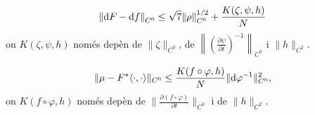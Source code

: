 
\begin{lema}
    \label{lema:lema6}
    \begin{equation*}
        \left\| \text dF -\text df \right\|_{C^0} \le \sqrt{7}\|\rho\|^{1/2}_{C^0} + \frac{K(\zeta,\psi,h)}{N}
    \end{equation*}
    on $K(\zeta,\psi,h)$ només depèn de $\|\zeta\|_{C^0}$, de $\left\|\left(  \frac{\partial\psi}{\partial t}\right)^{-1}\right\|_{C^0}$ i $\|h\|_{C^2}$.
\end{lema}

\begin{lema}
    \label{lema:lema7}
    \begin{equation*}
        \|\mu-F^*\langle\cdot, \cdot\rangle\|_{C^0} \le \frac{K(f\circ\varphi,h)}{N}\|\textrm d\varphi ^{-1}\|_{C^0}^2,
    \end{equation*}
    on $K(f\circ\varphi,h)$ només depèn de $\|\frac{\partial(f\circ\varphi)}{\partial t}\|_{C^0}$ i de $\|h\|_{C^2}$.
\end{lema}

